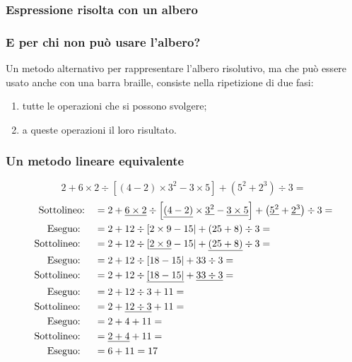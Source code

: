 \documentclass{beamer} %
\begin{document}
\begin{frame}\frametitle{Espressione risolta con un albero}

\espressionealberodia

\end{frame}


\begin{frame}\frametitle{E per chi non può usare l'albero?}

Un metodo alternativo per rappresentare l'albero risolutivo, 
ma che può essere usato anche con una barra braille, 
consiste nella ripetizione di due fasi:

\bigskip
\begin{enumerate} %
\item {} tutte le operazioni che si possono svolgere;
\item {} a queste operazioni il loro risultato.
\end{enumerate}

\end{frame}


\begin{frame}\frametitle{Un metodo lineare equivalente}

\[2 + 6 \times 2 \div 
 \left[ \left(4 -2 \right) \times 3^{2} - 3 \times 5 \right] +
 \left( 5^{2} + 2^{3} \right) \div 3 =\]
\begin{align*}
\text{Sottolineo:} \quad &= 2 + 
 \underline{6 \times 2} \div \left[ \underline{\left(4 -2 \right)} 
   \times \underline{3^{2}} - 
   \underline{3 \times 5} \right] +
 \left( \underline{5^{2}} + \underline{2^{3}} \right) \div 3 =\\
\text{Eseguo: } \quad &= 2 + 
 12 \div \left[ 2 \times 9 - 15 \right| +
 \left( 25 + 8 \right) \div 3 =\\
\text{Sottolineo: } \quad &= 2 + 
 12 \div \left[ \underline{2 \times 9} - 15 \right| +
 \underline{\left( 25 + 8 \right)} \div 3 = \hspace{20mm}\\ 
\text{Eseguo: } \quad &= 2 + 12 \div \left[ 18 - 15 \right| +
 33 \div 3 =\\ 
\text{Sottolineo: } \quad &= 2 + 
 12 \div \underline{\left[ 18 - 15 \right|} +
 \underline{33 \div 3} = \\ 
\text{Eseguo: } \quad &= 2 + 
 12 \div 3 +
 11 = \\ 
\text{Sottolineo: } \quad &= 2 + 
 \underline{12 \div 3} +
 11 = \\ 
\text{Eseguo: } \quad &= 2 + 
 4 +
 11 = \\ 
\text{Sottolineo: } \quad &= \underline{2 +  4} + 11 = \\ 
\text{Eseguo: } \quad &= 6 + 11 = 17
\end{align*}

\end{frame}
\end{document}

